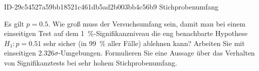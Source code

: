 \begin{exercise}
      {ID-29c54527a59bb18521c461db5ad2b003bb4c56b9}
      {Stichprobenumfang}
  \ifproblem\problem\par
    Es gilt $p=\num{0.5}$. Wie groß muss der Versuchsumfang
    sein, damit man bei einem einseitigen Test auf dem
    \SI{1}{\percent}-Signifikanzniveau die
    \glqq eng benachbarte\grqq{} Hypothese
    $H_1:p=\num{0.51}$ sehr sicher (in \SI{99}{\percent}
    aller Fälle) ablehnen kann?
    Arbeiten Sie mit einseitigen
    $\num{2.326}\sigma$-Um\-geb\-ung\-en.
    Formulieren Sie eine Aussage über das Verhalten von
    Signifikanztests bei sehr hohem Stichprobenumfang.
  \fi
\end{exercise}
